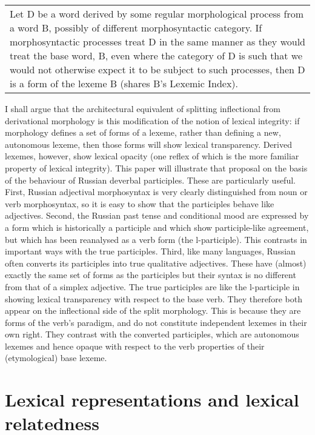 \documentclass[output=paper,
modfonts
]{LSP/langsci}
\begin{document}
\begin{tabular}{@{}p{28em}}

Let D be a word derived by some regular morphological process from a word B,  possibly of different morphosyntactic category. 
If morphosyntactic processes treat D in the same manner as they would treat the base word, B, even  where the category of D is such that we would not otherwise expect it to be subject to such processes, then D is a form of the lexeme B (shares B’s Lexemic Index).
\end{tabular}\bigskip
\begin{sloppypar}
I shall argue that the  architectural equivalent of splitting inflectional from derivational morphology is this modification of the notion of lexical integrity: if morphology defines a set of forms of a lexeme, rather than defining a new, autonomous lexeme, then those forms will show lexical transparency. Derived lexemes, however, show lexical opacity (one reflex of which is the more familiar property of lexical integrity). This paper will illustrate that proposal on the basis of the behaviour of Russian deverbal participles. These are particularly useful. First, Russian adjectival morphosyntax is very clearly distinguished from noun or verb morphosyntax, so it is easy to show that the participles behave like adjectives. Second, the Russian past tense and conditional mood are expressed by a form which is historically a participle and which show participle-like agreement, but which has been reanalysed as a verb form (the l-participle). This contrasts in important ways with the true participles. Third, like many languages, Russian often converts its participles into true qualitative adjectives. These have (almost) exactly the same set of forms as the participles but their syntax is no different from that of a simplex adjective. The true participles are like the l-participle in showing lexical transparency with respect to the base verb. They therefore both appear on the inflectional side of the split morphology. This is because they are forms of the verb’s paradigm, and do not constitute independent lexemes in their own right. They contrast with the converted participles, which are autonomous lexemes and hence opaque with respect to the verb properties of their (etymological) base lexeme.\end{sloppypar}

\nocite{RussGramm80-I}
\section{Lexical representations and lexical relatedness}\label{sec:lexreprel}
\end{document}
